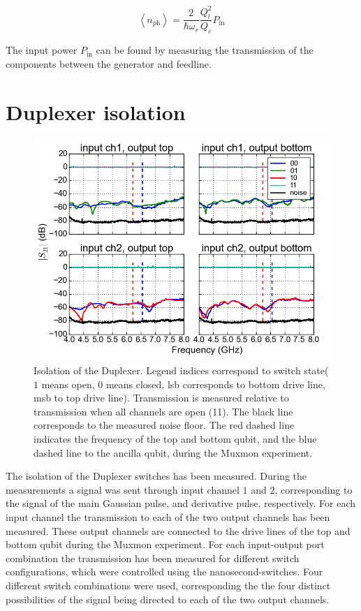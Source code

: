   \begin{equation}
    \left<n_\text{ph}\right> = \frac{2}{\hbar \omega_r}\frac{Q_l^2}{Q_c}P_\text{in}
  \end{equation}

  The input power $P_\text{in}$ can be found by measuring the transmission of the components between the generator and feedline.



\chapter{Duplexer isolation}
  \label{ch:Duplexer isolation}

  \begin{figure}[h]
    \centering
    \includegraphics[width=\textwidth]{../Figures/Appendix/Duplexer isolation.png}
    \caption{Isolation of the Duplexer. Legend indices correspond to switch state($1$ means open, $0$ means closed, lsb corresponds to bottom drive line, msb to top drive line). Transmission is measured relative to transmission when all channels are open (11). The black line corresponds to the measured noise floor. The red dashed line indicates the frequency of the top and bottom qubit, and the blue dashed line to the ancilla qubit, during the Muxmon experiment.}
    \label{fig:Duplexer isolation}
  \end{figure}

  The isolation of the Duplexer switches has been measured. During the measurements a signal was sent through input channel $1$ and $2$, corresponding to the signal of the main Gaussian pulse, and derivative pulse, respectively. For each input channel the transmission to each of the two output channels has been measured. These output channels are connected to the drive lines of the top and bottom qubit during the Muxmon experiment. For each input-output port combination the transmission has been measured for different switch configurations, which were controlled using the nanosecond-switches. Four different switch combinations were used, corresponding the the four distinct possibilities of the signal being directed to each of the two output channels.

